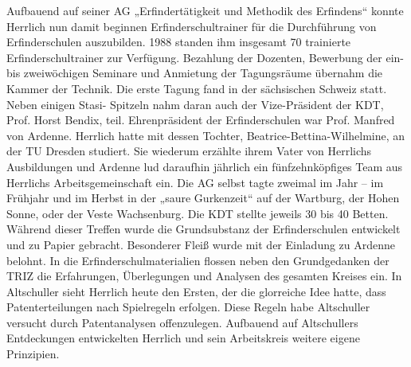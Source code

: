 \documentclass[11pt,a4paper]{article}
\begin{document}
Aufbauend auf seiner AG „Erfindertätigkeit und Methodik des Erfindens“ konnte
Herrlich nun damit beginnen Erfinderschultrainer für die Durchführung von
Erfinderschulen auszubilden. 1988 standen ihm insgesamt 70 trainierte
Erfinderschultrainer zur Verfügung. Bezahlung der Dozenten, Bewerbung der ein-
bis zweiwöchigen Seminare und Anmietung der Tagungsräume übernahm die Kammer
der Technik. Die erste Tagung fand in der sächsischen Schweiz statt. Neben
einigen Stasi- Spitzeln nahm daran auch der Vize-Präsident der KDT,
Prof. Horst Bendix, teil.  Ehrenpräsident der Erfinderschulen war
Prof. Manfred von Ardenne. Herrlich hatte mit dessen Tochter,
Beatrice-Bettina-Wilhelmine, an der TU Dresden studiert. Sie wiederum erzählte
ihrem Vater von Herrlichs Ausbildungen und Ardenne lud daraufhin jährlich ein
fünfzehnköpfiges Team aus Herrlichs Arbeitsgemeinschaft ein. Die AG selbst
tagte zweimal im Jahr – im Frühjahr und im Herbst in der „saure Gurkenzeit“
auf der Wartburg, der Hohen Sonne, oder der Veste Wachsenburg. Die KDT stellte
jeweils 30 bis 40 Betten.  Während dieser Treffen wurde die Grundsubstanz der
Erfinderschulen entwickelt und zu Papier gebracht. Besonderer Fleiß wurde mit
der Einladung zu Ardenne belohnt. In die Erfinderschulmaterialien flossen
neben den Grundgedanken der TRIZ die Erfahrungen, Überlegungen und Analysen
des gesamten Kreises ein. In Altschuller sieht Herrlich heute den Ersten, der
die glorreiche Idee hatte, dass Patenterteilungen nach Spielregeln
erfolgen. Diese Regeln habe Altschuller versucht durch Patentanalysen
offenzulegen.  Aufbauend auf Altschullers Entdeckungen entwickelten Herrlich
und sein Arbeitskreis weitere eigene Prinzipien.
\end{document}
